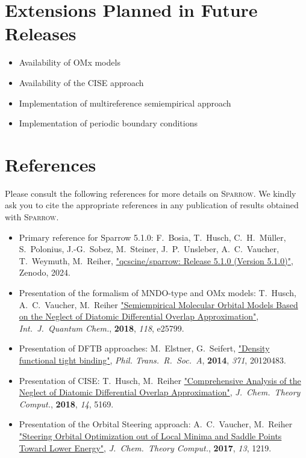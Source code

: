 \documentclass[]{tufte-book}
\begin{document}
\chapter{Extensions Planned in Future Releases}
\begin{itemize}
\item Availability of OMx models
\item Availability of the CISE approach
\item Implementation of multireference semiempirical approach
\item Implementation of periodic boundary conditions
\end{itemize}



\chapter{References}

Please consult the following references for more details on \textsc{Sparrow}.
We kindly ask you to cite the appropriate references in any publication of results obtained with \textsc{Sparrow}.
\vspace{1.0cm}

\begin{itemize}
\item Primary reference for Sparrow 5.1.0:
F.~Bosia, T.~Husch, C.~H.~M\"uller, S.~Polonius, J.-G.~Sobez, M.~Steiner, J.~P.~Unsleber, A.~C.~Vaucher, T.~Weymuth, M.~Reiher, \href{https://doi.org/10.5281/zenodo.3244105}{"qcscine/sparrow: Release 5.1.0 (Version 5.1.0)"}, Zenodo, 2024.
\item Presentation of the formalism of MNDO-type and OMx models: \newline
T.~Husch, A.~C.~Vaucher, M.~Reiher \href{https://doi.org/10.1002/qua.25799}{"Semiempirical Molecular Orbital Models Based on the Neglect of Diatomic Differential Overlap Approximation"}, \textit{Int.~J.~Quantum Chem.}, \textbf{2018}, \textit{118}, e25799.
\item Presentation of DFTB approaches: \newline
M.~Elstner, G.~Seifert, \href{https://doi.org/10.1098/rsta.2012.0483}{"Density functional tight binding"}, \textit{Phil. Trans.~R.~Soc.~A}, \textbf{2014}, \textit{371}, 20120483.
\item Presentation of CISE: \newline
T.~Husch, M.~Reiher \href{https://doi.org/10.1021/acs.jctc.8b00601}{"Comprehensive Analysis of the Neglect of Diatomic Differential Overlap Approximation"}, \textit{J.~Chem.~Theory Comput.}, \textbf{2018}, \textit{14}, 5169.
\item Presentation of the Orbital Steering approach: \newline
A.~C.~Vaucher, M.~Reiher
    \href{https://doi.org/10.1021/acs.jctc.7b00011}{"Steering Orbital
    Optimization out of Local Minima and Saddle Points Toward Lower Energy"},
    \textit{J.~Chem.~Theory Comput.}, \textbf{2017}, \textit{13}, 1219.
\end{itemize}
\end{document}
